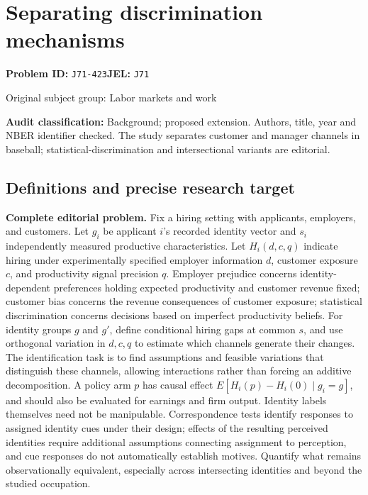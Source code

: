 \documentclass[11pt,a4paper]{article}
\begin{document}
\section*{Separating discrimination mechanisms}
\textbf{Problem ID:} \texttt{J71-423}\quad \textbf{JEL:} \texttt{J71}\par
\label{problem:OP-0356}
{\sffamily\small\color{muted}Original subject group: Labor markets and work\par}
\label{definitions:problem:30007638}
\textbf{Audit classification:} Background; proposed extension. Authors, title, year and NBER identifier checked. The study separates customer and manager channels in baseball; statistical-discrimination and intersectional variants are editorial.
\subsection*{Definitions and precise research target}
\textbf{Complete editorial problem.} Fix a hiring setting with applicants, employers, and customers. Let \(g_i\) be applicant \(i\)'s recorded identity vector and \(s_i\) independently measured productive characteristics. Let \(H_i(d,c,q)\) indicate hiring under experimentally specified employer information \(d\), customer exposure \(c\), and productivity signal precision \(q\). Employer prejudice concerns identity-dependent preferences holding expected productivity and customer revenue fixed; customer bias concerns the revenue consequences of customer exposure; statistical discrimination concerns decisions based on imperfect productivity beliefs. For identity groups \(g\) and \(g'\), define conditional hiring gaps at common \(s\), and use orthogonal variation in \(d,c,q\) to estimate which channels generate their changes. The identification task is to find assumptions and feasible variations that distinguish these channels, allowing interactions rather than forcing an additive decomposition. A policy arm \(p\) has causal effect \(E[H_i(p)-H_i(0)\mid g_i=g]\), and should also be evaluated for earnings and firm output. Identity labels themselves need not be manipulable. Correspondence tests identify responses to assigned identity cues under their design; effects of the resulting perceived identities require additional assumptions connecting assignment to perception, and cue responses do not automatically establish motives. Quantify what remains observationally equivalent, especially across intersecting identities and beyond the studied occupation.
\end{document}
